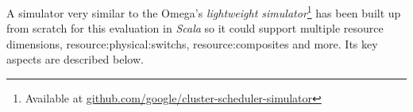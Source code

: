 A simulator very similar to the Omega's \cite{omega} \textit{lightweight simulator}\footnote[2]{\label{omega_simulator} Available at \href{https://github.com/google/cluster-scheduler-simulator}{github.com/google/cluster-scheduler-simulator}} has been built up from scratch for this evaluation in \textit{Scala} so it could support multiple resource dimensions, \glspl{resource:physical:switch}, \glspl{resource:composite} and more.
Its key aspects are described below.